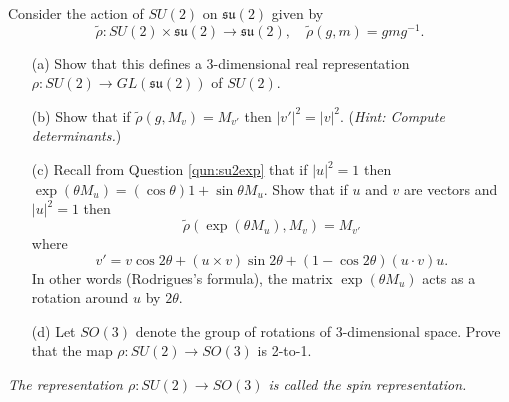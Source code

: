 \documentclass[12pt]{article}
\begin{document}
\begin{question}
Consider the action of $SU(2)$ on $\mathfrak{su}(2)$ given by
\[\tilde{\rho}\colon SU(2)\times\mathfrak{su}(2)\to\mathfrak{su}(2),\quad\tilde{\rho}(g,m)=gmg^{-1}.\]
\begin{enumerate}
\item[(a)] Show that this defines a 3-dimensional real representation $\rho\colon SU(2)\to GL(\mathfrak{su}(2))$ of $SU(2)$.
\item[(b)] Show that if $\tilde{\rho}(g,M_v)=M_{v'}$ then $|v'|^2=|v|^2$. ({\em Hint: Compute determinants.})
\item[(c)] Recall from Question \ref{qun:su2exp} that if $|u|^2=1$ then $\exp(\theta M_u)=(\cos\theta)1+\sin\theta M_u$. Show that if $u$ and $v$ are vectors and $|u|^2=1$ then
\[\tilde{\rho}(\exp(\theta M_u),M_v)=M_{v'}\]
where
\[v'=v\cos 2\theta+(u\times v)\sin 2\theta+(1-\cos 2\theta)(u\cdot v)u.\]
In other words (Rodrigues's formula), the matrix $\exp(\theta M_u)$ acts as a rotation around $u$ by $2\theta$.
\item[(d)] Let $SO(3)$ denote the group of rotations of 3-dimensional space. Prove that the map $\rho\colon SU(2)\to SO(3)$ is 2-to-1.
\end{enumerate}
\end{question}

{\em The representation $\rho\colon SU(2)\to SO(3)$ is called the spin representation.}
\end{document}
